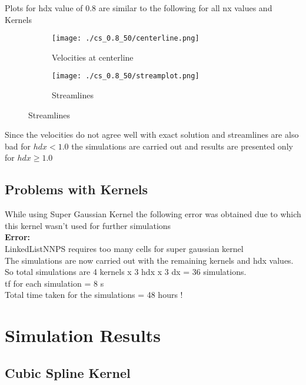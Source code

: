 \documentclass[12pt, a4paper]{report}
\begin{document}
\newpage
\noindent
Plots for hdx value of 0.8 are similar to the following for all nx values and Kernels
\begin{figure}[H]
\begin{subfigure}{0.5\textwidth}
	\texttt{[image: ./cs\_0.8\_50/centerline.png]}
	\caption{Velocities at centerline}
\end{subfigure}
\begin{subfigure}{0.5\textwidth}
	\texttt{[image: ./cs\_0.8\_50/streamplot.png]}
	\caption{Streamlines}
\end{subfigure}
\end{figure}

\noindent
Since the velocities do not agree well with exact solution and streamlines are also bad for $hdx < 1.0$ the simulations are carried out and results are presented only for $hdx \geq 1.0$ \\

\section{Problems with Kernels}
While using Super Gaussian Kernel the following error was obtained due to which this kernel wasn't used for further simulations \\
\textbf{Error:}\\
\indent LinkedListNNPS requires too many cells for super gaussian kernel\\[0.2in]

\noindent
The simulations are now carried out with the remaining kernels and hdx values. So total simulations are 4 kernels x 3 hdx x 3 dx = 36 simulations.\\
tf for each simulation = 8 s \\
Total time taken for the simulations = 48 hours ! 

\chapter{Simulation Results}

\section{Cubic Spline Kernel}
\end{document}
